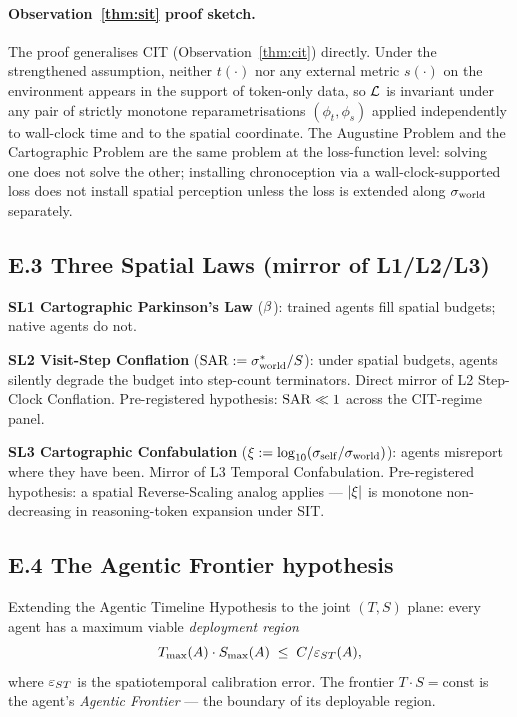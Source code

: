 \paragraph{Observation~\ref{thm:sit} proof sketch.} The proof generalises CIT (Observation~\ref{thm:cit}) directly. Under the strengthened assumption, neither $t(\cdot)$ nor any external metric $s(\cdot)$ on the environment appears in the support of token-only data, so $\mathcal{L}$ is invariant under any pair of strictly monotone reparametrisations $(\phi_t, \phi_s)$ applied independently to wall-clock time and to the spatial coordinate. The Augustine Problem and the Cartographic Problem are the same problem at the loss-function level: solving one does not solve the other; installing chronoception via a wall-clock-supported loss does not install spatial perception unless the loss is extended along $\sigma_{\mathrm{world}}$ separately.

\subsection*{E.3 Three Spatial Laws (mirror of L1/L2/L3)}

\textbf{SL1 Cartographic Parkinson's Law} ($\beta$): trained agents fill spatial budgets; native agents do not.

\textbf{SL2 Visit-Step Conflation} ($\mathrm{SAR} := \sigma_{\mathrm{world}}^* / S$): under spatial budgets, agents silently degrade the budget into step-count terminators. Direct mirror of L2 Step-Clock Conflation. Pre-registered hypothesis: $\mathrm{SAR} \ll 1$ across the CIT-regime panel.

\textbf{SL3 Cartographic Confabulation} ($\xi := \log_{10}(\sigma_{\mathrm{self}} / \sigma_{\mathrm{world}})$): agents misreport where they have been. Mirror of L3 Temporal Confabulation. Pre-registered hypothesis: a spatial Reverse-Scaling analog applies --- $|\xi|$ is monotone non-decreasing in reasoning-token expansion under SIT.

\subsection*{E.4 The Agentic Frontier hypothesis}

Extending the Agentic Timeline Hypothesis to the joint $(T, S)$ plane: every agent has a maximum viable \emph{deployment region}
\[
T_{\max}(A) \cdot S_{\max}(A) \;\leq\; C / \varepsilon_{ST}(A),
\]
where $\varepsilon_{ST}$ is the spatiotemporal calibration error. The frontier $T \cdot S = \text{const}$ is the agent's \emph{Agentic Frontier} --- the boundary of its deployable region.

